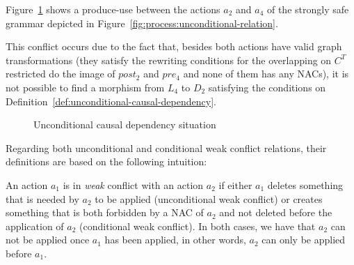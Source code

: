 \begin{example}Figure~\ref{fig:process:unconditional-relation:dependency}  shows a produce-use between the actions $a_2$ and $a_4$ of the strongly safe grammar depicted in Figure~\ref{fig:process:unconditional-relation}.

  This conflict occurs due to the fact that, besides both actions have valid graph transformations (they satisfy the rewriting conditions for the overlapping on $C^T$ restricted do the image of $post_2$ and $pre_4$ and none of them has any NACs), it is not possible to find a morphism from $L_4$ to $D_2$ satisfying the conditions on Definition~\ref{def:unconditional-causal-dependency}.

\begin{figure}[!ht]
  \centering
  \caption{Unconditional causal dependency situation}\label{fig:process:unconditional-relation:dependency}
\end{figure}
\end{example}

Regarding both unconditional and conditional weak conflict relations, their definitions are based on the following intuition:

  \begin{intuition} An action $a_1$ is in \emph{weak} conflict with an action $a_2$ if either $a_1$ deletes something that is needed by $a_2$ to be applied (unconditional weak conflict) or creates something that is both forbidden by a NAC of $a_2$ and not deleted before the application of $a_2$ (conditional weak conflict). In both cases, we have that $a_2$ can not be applied once $a_1$ has been applied, in other words, $a_2$ can only be applied before $a_1$.
\end{intuition}

